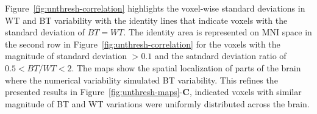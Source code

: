\documentclass[conference]{IEEEtran}
\begin{document}
\begin{figure}[ht]
  \end{figure}


Figure~\ref{fig:unthresh-correlation} highlights the voxel-wise standard deviations in WT and BT variability
with the identity lines that indicate voxels with the standard deviation of $BT = WT$.
The identity area is represented on MNI space in the second row in Figure~\ref{fig:unthresh-correlation}
for the voxels with the magnitude of standard deviation $> 0.1$ and the satndard deviation ratio of $0.5 < BT/WT < 2$.
The maps show the spatial localization of parts of the brain where the numerical variability simulated BT variability.
This refines the presented results in Figure~\ref{fig:unthresh-maps}-\textbf{C},
indicated voxels with similar magnitude of BT and WT variations were uniformly distributed across the brain.
\end{document}
